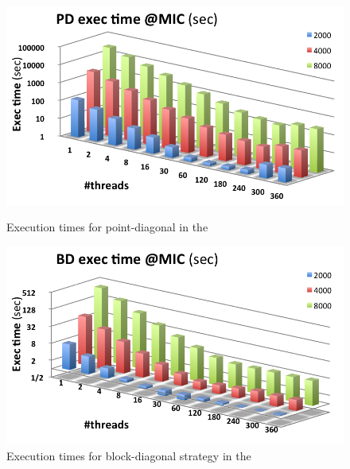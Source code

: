 \documentclass[../thesis]{subfiles}
\begin{document}
	\begin{figure}[t]
		\begin{minipage}{0.48\textwidth}
			\centering
			\includegraphics[width=\textwidth]{assets/images/mic/point-diagonal.png}
			\captionsetup{font=small}
			\caption{Execution times for point-diagonal in the \intel\xeonphi}
			\label{fig:mic:point:diagonal:times}
		\end{minipage}
		\hfill
		\begin{minipage}{0.48\textwidth}
			\centering
			\includegraphics[width=\textwidth]{assets/images/mic/block-diagonal.png}
			\captionsetup{font=small}
			\caption{Execution times for block-diagonal strategy in the \intel\xeonphi}
			\label{fig:mic:block:diagonal:times}
		\end{minipage}
	\end{figure}
\end{document}
